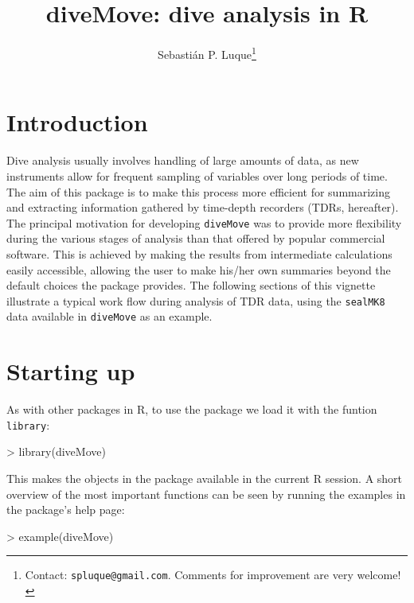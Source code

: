 \documentclass[12pt, letterpaper]{scrartcl}
\newcommand{\Robject}[1]{{\texttt{#1}}}
\newcommand{\Rfunction}[1]{{\texttt{#1}}}
\newcommand{\Rpackage}[1]{{\texttt{#1}}}
\newcommand{\R}{{\normalfont\textsf{R }}{}}
\begin{document}
\title{\bfseries{diveMove: dive analysis in R}}
\author{Sebastián P. Luque\thanks{Contact: \texttt{spluque@gmail.com}.
    Comments for improvement are very welcome!}}
\date{}

\maketitle


\tableofcontents

\section{Introduction}

Dive analysis usually involves handling of large amounts of data, as new
instruments allow for frequent sampling of variables over long periods of
time.  The aim of this package is to make this process more efficient for
summarizing and extracting information gathered by time-depth recorders
(TDRs, hereafter).  The principal motivation for developing
\Rpackage{diveMove} was to provide more flexibility during the various
stages of analysis than that offered by popular commercial software.  This
is achieved by making the results from intermediate calculations easily
accessible, allowing the user to make his/her own summaries beyond the
default choices the package provides.  The following sections of this
vignette illustrate a typical work flow during analysis of TDR data, using
the \Robject{sealMK8} data available in \Rpackage{diveMove} as an example.


\section{Starting up}
\label{sec:starting}

As with other packages in R, to use the package we load it with the
funtion \Rfunction{library}:
\begin{Schunk}
\begin{Sinput}
> library(diveMove)
\end{Sinput}
\end{Schunk}

This makes the objects in the package available in the current \R session.
A short overview of the most important functions can be seen by running
the examples in the package's help page:
\begin{Schunk}
\begin{Sinput}
> example(diveMove)
\end{Sinput}
\end{Schunk}
\end{document}

